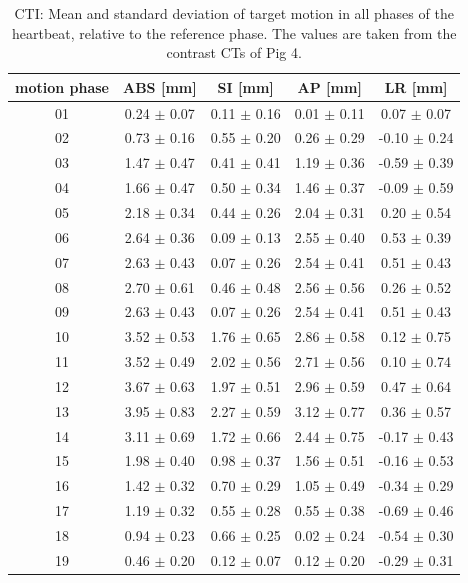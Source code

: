 \documentclass[type=dr, dr=rernat, accentcolor=tud7b,colorbacktitle, bigchapter, openright, twoside, 12pt ]{tudthesis}
\begin{document}
\newpage

\begin{table}[H]
  \centering
  \scriptsize
  \caption{CTI: Mean and standard deviation of target motion in all phases of the heartbeat, relative to the reference phase. The values are 
  taken from the contrast CTs of Pig 4.}
  \begin{tabular}{|c|c|c|c|c|}
    \hline\hline
    motion phase\rule{0pt}{2.6ex}\rule[-1.2ex]{0pt}{0pt} & ABS [mm] & SI [mm] & AP [mm] & LR [mm]\\
    \hline
01 &0.24 $\pm$ 0.07 &0.11 $\pm$ 0.16 &0.01 $\pm$ 0.11 &0.07 $\pm$ 0.07 \\
02 &0.73 $\pm$ 0.16 &0.55 $\pm$ 0.20 &0.26 $\pm$ 0.29 &-0.10 $\pm$ 0.24 \\
03 &1.47 $\pm$ 0.47 &0.41 $\pm$ 0.41 &1.19 $\pm$ 0.36 &-0.59 $\pm$ 0.39 \\
04 &1.66 $\pm$ 0.47 &0.50 $\pm$ 0.34 &1.46 $\pm$ 0.37 &-0.09 $\pm$ 0.59 \\
05 &2.18 $\pm$ 0.34 &0.44 $\pm$ 0.26 &2.04 $\pm$ 0.31 &0.20 $\pm$ 0.54 \\
06 &2.64 $\pm$ 0.36 &0.09 $\pm$ 0.13 &2.55 $\pm$ 0.40 &0.53 $\pm$ 0.39 \\
07 &2.63 $\pm$ 0.43 &0.07 $\pm$ 0.26 &2.54 $\pm$ 0.41 &0.51 $\pm$ 0.43 \\
08 &2.70 $\pm$ 0.61 &0.46 $\pm$ 0.48 &2.56 $\pm$ 0.56 &0.26 $\pm$ 0.52 \\
09 &2.63 $\pm$ 0.43 &0.07 $\pm$ 0.26 &2.54 $\pm$ 0.41 &0.51 $\pm$ 0.43 \\
10 &3.52 $\pm$ 0.53 &1.76 $\pm$ 0.65 &2.86 $\pm$ 0.58 &0.12 $\pm$ 0.75 \\
11 &3.52 $\pm$ 0.49 &2.02 $\pm$ 0.56 &2.71 $\pm$ 0.56 &0.10 $\pm$ 0.74 \\
12 &3.67 $\pm$ 0.63 &1.97 $\pm$ 0.51 &2.96 $\pm$ 0.59 &0.47 $\pm$ 0.64 \\
13 &3.95 $\pm$ 0.83 &2.27 $\pm$ 0.59 &3.12 $\pm$ 0.77 &0.36 $\pm$ 0.57 \\
14 &3.11 $\pm$ 0.69 &1.72 $\pm$ 0.66 &2.44 $\pm$ 0.75 &-0.17 $\pm$ 0.43 \\
15 &1.98 $\pm$ 0.40 &0.98 $\pm$ 0.37 &1.56 $\pm$ 0.51 &-0.16 $\pm$ 0.53 \\
16 &1.42 $\pm$ 0.32 &0.70 $\pm$ 0.29 &1.05 $\pm$ 0.49 &-0.34 $\pm$ 0.29 \\
17 &1.19 $\pm$ 0.32 &0.55 $\pm$ 0.28 &0.55 $\pm$ 0.38 &-0.69 $\pm$ 0.46 \\
18 &0.94 $\pm$ 0.23 &0.66 $\pm$ 0.25 &0.02 $\pm$ 0.24 &-0.54 $\pm$ 0.30 \\
19 &0.46 $\pm$ 0.20 &0.12 $\pm$ 0.07 &0.12 $\pm$ 0.20 &-0.29 $\pm$ 0.31 \\
    \hline\hline
  \end{tabular}
  \label{tab:motion:CTI:Pig4}
\end{table}
\end{document}
